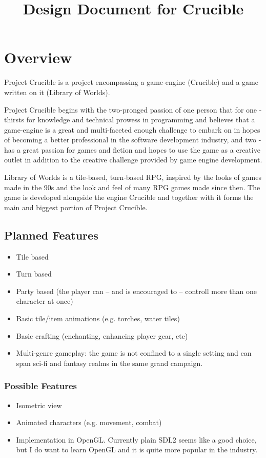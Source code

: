 \documentclass[a4paper,10pt]{book}
\begin{document}
\title{Design Document for Crucible}
\tableofcontents

\newcommand{\Projectname}{Project Crucible}
\newcommand{\Enginename}{Crucible}
\newcommand{\Gamename}{Library of Worlds}

\chapter{Overview}
\Projectname{} is a project encompassing a game-engine (\Enginename{}) and a game written on it (\Gamename{}).

\Projectname{} begins with the two-pronged passion of one person that for one - thirsts for knowledge and technical prowess in programming and believes that a game-engine is a great and multi-faceted enough challenge to embark on in hopes of becoming a better professional in the software development industry, and two - has a great passion for games and fiction and hopes to use the game as a creative outlet in addition to the creative challenge provided by game engine development.

\Gamename{} is a tile-based, turn-based RPG, inspired by the looks of games made in the 90s and the look and feel of many RPG games made since then. The game is developed alongside the engine \Enginename{} and together with it forms the main and biggest portion of \Projectname{}.

\section{Planned Features}
\begin{itemize}
 \item Tile based
 \item Turn based
 \item Party based (the player can -- and is encouraged to -- controll more than one character at once)
 \item Basic tile/item animations (e.g. torches, water tiles)
 \item Basic crafting (enchanting, enhancing player gear, etc)
 \item Multi-genre gameplay: the game is not confined to a single setting and can span sci-fi and fantasy realms in the same grand campaign.
\end{itemize}

\subsection{Possible Features}
\begin{itemize}
 \item Isometric view
 \item Animated characters (e.g. movement, combat)
 \item Implementation in OpenGL. Currently plain SDL2 seems like a good choice, but I do want to learn OpenGL and it is quite more popular in the industry.
\end{itemize}
\end{document}

